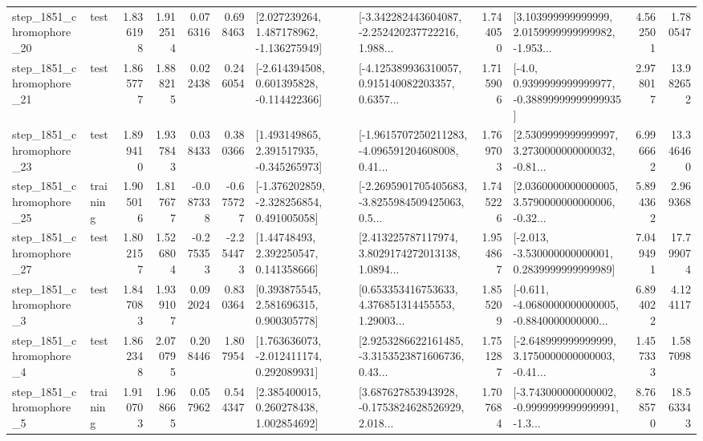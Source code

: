 \begin{tabular}{llrrrrllrlrr}
 step\_1851\_chromophore\_20 &      test &      1.836198 &    1.912514 &      0.076316 &  0.698463 &    [2.027239264, 1.487178962, -1.136275949] &  [-3.342282443604087, -2.252420237722216, 1.988... &       1.744050 &  [3.103999999999999, 2.0159999999999982, -1.953... &            4.562501 &          1.780547 \\
 step\_1851\_chromophore\_21 &      test &      1.865777 &    1.888215 &      0.022438 &  0.246054 &   [-2.614394508, 0.601395828, -0.114422366] &  [-4.125389936310057, 0.915140082203357, 0.6357... &       1.715906 &   [-4.0, 0.9399999999999977, -0.38899999999999935] &            2.978017 &         13.982652 \\
 step\_1851\_chromophore\_23 &      test &      1.899410 &    1.937843 &      0.038433 &  0.380366 &    [1.493149865, 2.391517935, -0.345265973] &  [-1.9615707250211283, -4.096591204608008, 0.41... &       1.769703 &  [2.5309999999999997, 3.2730000000000032, -0.81... &            6.996662 &         13.346460 \\
 step\_1851\_chromophore\_25 &  training &      1.905016 &    1.817677 &     -0.087338 & -0.675727 &   [-1.376202859, -2.328256854, 0.491005058] &  [-2.2695901705405683, -3.8255984509425063, 0.5... &       1.745226 &  [2.0360000000000005, 3.5790000000000006, -0.32... &            5.894362 &          2.969368 \\
 step\_1851\_chromophore\_27 &      test &      1.802157 &    1.526804 &     -0.275353 & -2.254473 &      [1.44748493, 2.392250547, 0.141358666] &  [2.413225787117974, 3.8029174272013138, 1.0894... &       1.954867 &   [-2.013, -3.530000000000001, 0.2839999999999989] &            7.049491 &         17.799074 \\
  step\_1851\_chromophore\_3 &      test &      1.847083 &    1.939107 &      0.092024 &  0.830364 &     [0.393875545, 2.581696315, 0.900305778] &  [0.653353416753633, 4.376851314455553, 1.29003... &       1.855209 &  [-0.611, -4.0680000000000005, -0.8840000000000... &            6.894022 &          4.124117 \\
  step\_1851\_chromophore\_4 &      test &      1.862348 &    2.070795 &      0.208446 &  1.807954 &    [1.763636073, -2.012411174, 0.292089931] &  [2.9253286622161485, -3.3153523871606736, 0.43... &       1.751287 &  [-2.648999999999999, 3.1750000000000003, -0.41... &            1.457333 &          1.587098 \\
  step\_1851\_chromophore\_5 &  training &      1.910703 &    1.968665 &      0.057962 &  0.544347 &     [2.385400015, 0.260278438, 1.002854692] &  [3.687627853943928, -0.1753824628526929, 2.018... &       1.707684 &  [-3.743000000000002, -0.9999999999999991, -1.3... &            8.768570 &         18.563343 \\

\end{tabular}
